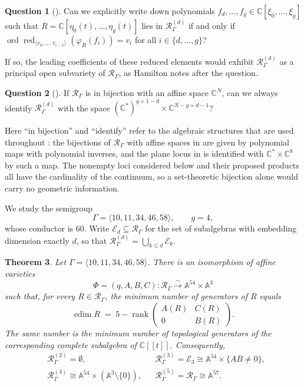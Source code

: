 \documentclass{amsart}
\newtheorem{theorem}{Theorem}[section]
\theoremstyle{definition}
\newtheorem{question}[theorem]{Question}
\theoremstyle{remark}
\numberwithin{equation}{section}
\newcommand{\CC}{\mathbb{C}}
\newcommand{\AF}{\mathbb{A}}
\newcommand{\Rs}{\mathcal{R}_\Gamma}
\newcommand{\Rd}[1]{\mathcal{R}^{(#1)}_\Gamma}
\newcommand{\Ed}[1]{\mathcal{E}_{#1}}
\newcommand{\ps}{[\![t]\!]}
\DeclareMathOperator{\ord}{ord}
\DeclareMathOperator{\edim}{edim}
\DeclareMathOperator{\rank}{rank}
\DeclareMathOperator{\red}{red}
\begin{document}
\begin{question}[{\cite[Question~4.7]{Ham20}}]\label{q:47}
Can we explicitly write down polynomials $f_d,\dots,f_g\in\CC[\xi_0,\dots,\xi_g]$ such that $R=\CC[\eta_0(t),\dots,\eta_g(t)]$ lies in $\Rd{d}$ if and only if $\ord\red_{\langle v_0,\dots,v_{i-1}\rangle}(\varphi_R(f_i))=v_i$ for all $i\in\{d,\dots,g\}$?
\end{question}

If so, the leading coefficients of these reduced elements would exhibit $\Rd{d}$ as a principal open subvariety of $\Rs$, as Hamilton notes after the question.

\begin{question}[{\cite[Question~4.8]{Ham20}}]\label{q:48}
If $\Rs$ is in bijection with an affine space $\CC^N$, can we always identify $\Rd{d}$ with the space $(\CC^*)^{g+1-d}\times\CC^{N-g+d-1}$?
\end{question}

Here ``in bijection'' and ``identify'' refer to the algebraic structures that are used throughout \cite{Ham20}: the bijections of $\Rs$ with affine spaces in \cite[Section~3]{Ham20} are given by polynomial maps with polynomial inverses, and the plane locus in \cite[Example~4.6]{Ham20} is identified with $\CC^*\times\CC^8$ by such a map. The nonempty loci considered below and their proposed products all have the cardinality of the continuum, so a set-theoretic bijection alone would carry no geometric information.

We study the semigroup
\[
\Gamma=\langle 10,11,34,46,58\rangle,\qquad g=4,
\]
whose conductor is $60$. Write $\Ed{d}\subseteq\Rs$ for the set of subalgebras with embedding dimension exactly $d$, so that $\Rd{d}=\bigcup_{k\le d}\Ed{k}$.

\begin{theorem}\label{thm:main}
Let $\Gamma=\langle 10,11,34,46,58\rangle$. There is an isomorphism of affine varieties
\[
\Phi=(q,A,B,C)\colon\Rs\xrightarrow{\ \sim\ }\AF^{54}\times\AF^3
\]
such that, for every $R\in\Rs$, the minimum number of generators of $R$ equals
\[
\edim R \;=\; 5-\rank\begin{pmatrix}A(R)&C(R)\\0&B(R)\end{pmatrix}.
\]
The same number is the minimum number of topological generators of the corresponding complete subalgebra of $\CC\ps$. Consequently,
\begin{align*}
&\Rd{2}=\emptyset, && \Rd{3}=\Ed{3}\cong\AF^{54}\times\{AB\ne0\},\\
&\Rd{4}\cong\AF^{54}\times(\AF^3\setminus\{0\}), && \Rd{5}=\Rs\cong\AF^{57}.
\end{align*}
\end{theorem}
\end{document}
